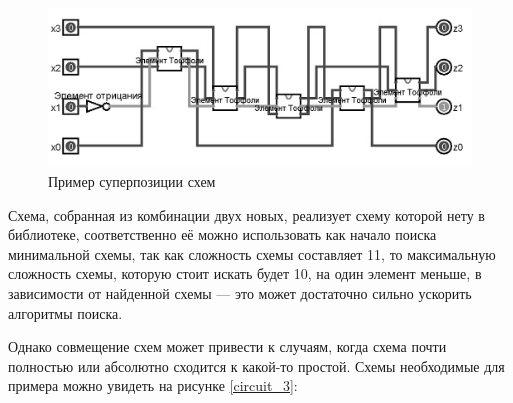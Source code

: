 \documentclass[14pt]{extarticle} %
\begin{document}
\begin{figure}[h]
	\centering
	\caption{Пример суперпозиции схем}
	\includegraphics[scale=0.35]{img/amakgam.jpg}
	
	\label{circuit_amal}
\end{figure}

Схема, собранная из комбинации двух новых, реализует схему которой нету в библиотеке, соответственно её можно использовать как начало поиска минимальной схемы, так как сложность схемы составляет 11, то максимальную сложность схемы, которую стоит искать будет 10, на один элемент меньше, в зависимости от найденной схемы — это может достаточно сильно ускорить алгоритмы поиска.

Однако совмещение схем может привести к случаям, когда схема почти полностью или абсолютно сходится к какой-то простой. Схемы необходимые для примера можно увидеть на рисунке \ref{circuit_3}:
\end{document}
